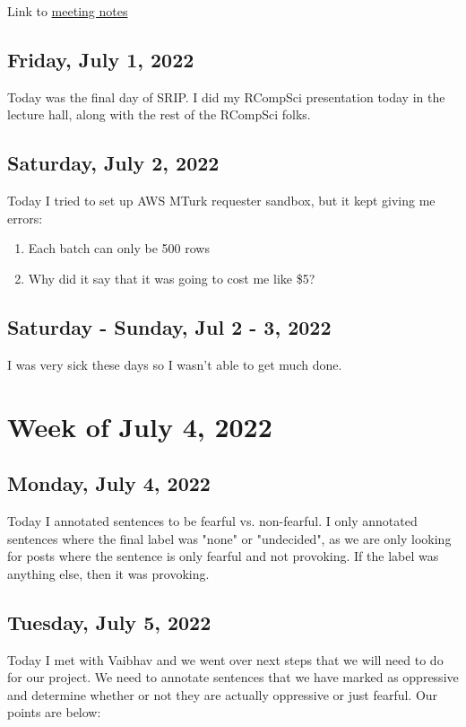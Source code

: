 \documentclass[11pt,letterpaper]{article}
\begin{document}
Link to \href{https://docs.google.com/document/d/1kZTLp8gpHfW_Fc1MB4RqrThNCKRpGbhtCXggADEOW5w/edit?usp=sharing}{meeting notes}

\subsection{Friday, July 1, 2022}
Today was the final day of SRIP. I did my RCompSci presentation today in the lecture hall, along with the rest of the RCompSci folks.

\subsection{Saturday, July 2, 2022}
Today I tried to set up AWS MTurk requester sandbox, but it kept giving me errors:

\begin{enumerate}
    \item Each batch can only be 500 rows
    \item Why did it say that it was going to cost me like \$5?
\end{enumerate}

\subsection{Saturday - Sunday, Jul 2 - 3, 2022}
I was very sick these days so I wasn't able to get much done.

\section{Week of July 4, 2022}
\subsection{Monday, July 4, 2022}
Today I annotated sentences to be fearful vs. non-fearful. I only annotated sentences where the final label was "none" or "undecided", as we are only looking for posts where the sentence is only fearful and not provoking. If the label was anything else, then it was provoking.

\subsection{Tuesday, July 5, 2022}
Today I met with Vaibhav and we went over next steps that we will need to do for our project. We need to annotate sentences that we have marked as oppressive and determine whether or not they are actually oppressive or just fearful. Our points are below:
\end{document}
